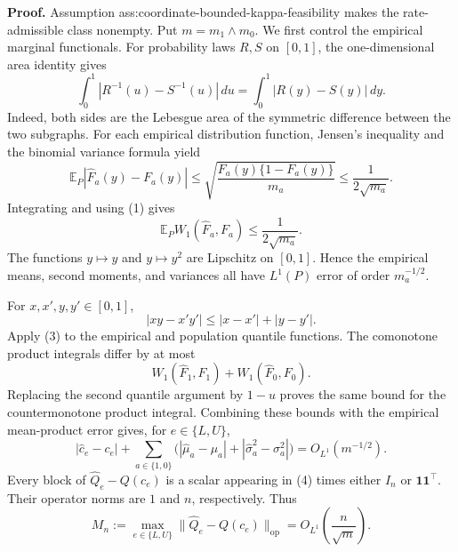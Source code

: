 \textbf{Proof.}
Assumption ass:coordinate-bounded-kappa-feasibility makes the rate-admissible class nonempty.  Put \(m=m_1\wedge m_0\).  We first control the empirical marginal functionals.  For probability laws \(R,S\) on \([0,1]\), the one-dimensional area identity gives
\[
\int_0^1|R^{-1}(u)-S^{-1}(u)|\,du
=\int_0^1|R(y)-S(y)|\,dy.
\tag{1}
\]
Indeed, both sides are the Lebesgue area of the symmetric difference between the two subgraphs.  For each empirical distribution function, Jensen's inequality and the binomial variance formula yield
\[
\mathbb E_P|\widehat F_a(y)-F_a(y)|
\le \sqrt{\frac{F_a(y)\{1-F_a(y)\}}{m_a}}
\le \frac{1}{2\sqrt{m_a}}.
\]
Integrating and using (1) gives
\[
\mathbb E_P W_1(\widehat F_a,F_a)\le \frac{1}{2\sqrt{m_a}}.
\tag{2}
\]
The functions \(y\mapsto y\) and \(y\mapsto y^2\) are Lipschitz on \([0,1]\).  Hence the empirical means, second moments, and variances all have \(L^1(P)\) error of order \(m_a^{-1/2}\).

For \(x,x',y,y'\in[0,1]\),
\[
|xy-x'y'|\le |x-x'|+|y-y'|.
\tag{3}
\]
Apply (3) to the empirical and population quantile functions.  The comonotone product integrals differ by at most
\[
W_1(\widehat F_1,F_1)+W_1(\widehat F_0,F_0).
\]
Replacing the second quantile argument by \(1-u\) proves the same bound for the countermonotone product integral.  Combining these bounds with the empirical mean-product error gives, for \(e\in\{L,U\}\),
\[
|\widehat c_e-c_e|+
\sum_{a\in\{1,0\}}
\bigl(|\widehat\mu_a-\mu_a|+|\widehat\sigma_a^2-\sigma_a^2|\bigr)
=O_{L^1}(m^{-1/2}).
\tag{4}
\]
Every block of \(\widehat Q_e-Q(c_e)\) is a scalar appearing in (4) times either \(I_n\) or \(\mathbf1\mathbf1^{\top}\).  Their operator norms are \(1\) and \(n\), respectively.  Thus
\[
M_n:=\max_{e\in\{L,U\}}
\lVert\widehat Q_e-Q(c_e)\rVert_{\mathrm{op}}
=O_{L^1}\!\left(\frac{n}{\sqrt m}\right).
\tag{5}
\]

